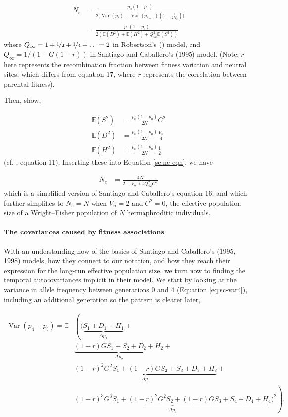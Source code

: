\documentclass[11pt]{article}
\newcommand{\nnn}{\nonumber}
\newcommand{\E}{\mathbb{E}}
\DeclareMathOperator{\var}{Var}
\begin{document}
\begin{align}
  N_e &= \frac{p_0(1-p_0)}{2\bigg(\var(p_t) - \var(p_{t-1}) \left(1 - \frac{1}{2N_e} \right)\bigg)} \nonumber \\
      &= \frac{p_0(1-p_0)}{2\left( \E(D^2) + \E(H^2) + Q_\infty^2 \E(S^2) \right)}
  \label{sc:ne-eqn}
\end{align}
%
where $Q_\infty = 1 + \nicefrac{1}{2} + \nicefrac{1}{4} + \ldots = 2$ in
Robertson's (\citeyear{Robertson1961-ho}) model, and $Q_\infty = 1/(1 - G
(1-r))$ in Santiago and Caballero's (1995) model. (Note: $r$ here represents
the recombination fraction between fitness variation and neutral sites, which
differs from \textcite{Santiago1995-hx} equation 17, where $r$ represents the
correlation between parental fitness).

Then, \textcite{Santiago1995-hx} show,

\begin{align}
  \E(S^2) &= \frac{p_0(1-p_0)}{2N} C^2 \\
  \E(D^2) &= \frac{p_0(1-p_0)}{2N} \frac{V_n}{4} \\
  \E(H^2) &= \frac{p_0(1-p_0)}{2N} \frac{1}{2}
\end{align}
%
(cf. \cite{Santiago1995-hx}, equation 11). Inserting these into Equation
\eqref{sc:ne-eqn}, we have

\begin{align}
  N_e &= \frac{4N}{2 + V_n + 4 Q_\infty^2 C^2}
\end{align}
%
which is a simplified version of Santiago and Caballero's equation 16, and
which further simplifies to $N_e = N$ when $V_n = 2$ and $C^2 = 0$, the
effective population size of a Wright--Fisher population of $N$ hermaphroditic
individuals.


\paragraph{The covariances caused by fitness associations}

With an understanding now of the basics of Santiago and Caballero's (1995,
1998) models, how they connect to our notation, and how they reach their
expression for the long-run effective population size, we turn now to finding
the temporal autocovariances implicit in their model. We start by looking at
the variance in allele frequency between generations $0$ and $4$ (Equation
\eqref{eq:sc-var4}), including an additional generation so the pattern is
clearer later,

\begin{align}
  \var(p_4 - p_0) = \E & \left( \bigg( \underbrace{S_1 + D_1 + H_1}_{\Delta p_1} + \right. \nonumber \\
                             & \underbrace{ (1-r) G S_1 + S_2 + D_2 + H_2}_{\Delta p_2} + \nonumber \\
                             &  \underbrace{ (1-r)^2 G^2 S_1 + (1-r) G S_2 + S_3 + D_3 + H_3}_{\Delta p_3} + \nonumber \\
                             &  \left. \underbrace{ (1-r)^3 G^3 S_1 + (1-r)^2 G^2 S_2 + (1-r) G S_3 + S_4 + D_4 + H_4}_{\Delta p_4} \bigg)^2 \right). \nnn 
\end{align}
\end{document}

